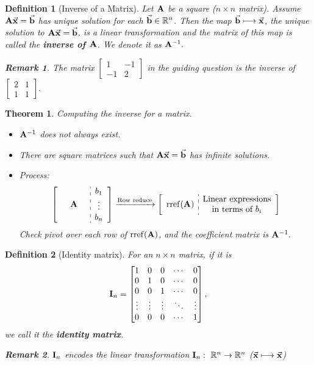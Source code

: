 \documentclass[12pt, a4paper]{article}
\newtheorem{thm}{Theorem}[subsection]
\newtheorem{df}{Definition}[subsection]
\newtheorem*{rmk}{\indent Remark}
\def\R{{\mathbb{R}}}
\def\rref{\mathrm{rref}}
\def\vecx{\va{x}}
\def\vecb{\va{b}}
\def\matrixA{\vb{A}}
\def\matrixI{\vb{I}}
\begin{document}
\begin{df}[Inverse of a Matrix]
	Let $\matrixA$ be a square ($n\times n$ matrix). Assume $\matrixA\vecx=\vecb$ has unique solution for each $\vecb\in\R^n$. Then the map $\vecb\longmapsto\vecx$, the unique solution to $\matrixA\vecx=\vecb$, is a linear transformation and the matrix of this map is called the \textbf{inverse of $\matrixA$}. We denote it as $\matrixA^{-1}.$
	\begin{rmk}
		The matrix $\begin{bmatrix}1&-1\\-1&2\end{bmatrix}$ in the guiding question is the inverse of $\begin{bmatrix}2&1\\1&1\end{bmatrix}.$	
	\end{rmk}
\end{df}
\begin{thm}
	Computing the inverse for a matrix.
	\begin{itemize}
		\item $\matrixA^{-1}$ does not always exist. 
		\item There are square matrices such that $\matrixA\vecx=\vecb$ has infinite solutions.
		\item Process:
		\[\left[\begin{array}{c:c}\quad\matrixA\quad &\begin{matrix}b_1\\\vdots\\b_n\end{matrix}\end{array}\right]\xrightarrow{\text{Row reduce}}\left[\begin{array}{c:c}\rref(\matrixA) &\begin{matrix}\text{Linear expressions}\\\text{in terms of }b_i\end{matrix}\end{array}\right]\]
		Check pivot over each row of $\rref(\matrixA)$, and the coefficient matrix is $\matrixA^{-1}.$
	\end{itemize}	
\end{thm}
\begin{df}[Identity matrix]
	For an $n\times n$ matrix, if it is \[\matrixI_n=\begin{bmatrix}1&0&0&\cdots&0\\0&1&0&\cdots&0\\0&0&1&\cdots&0\\\vdots&\vdots&\vdots&\ddots&\vdots\\0&0&0&\cdots&1\end{bmatrix},\] we call it the \textbf{identity matrix}. 
	\begin{rmk}
		$\matrixI_n$ encodes the linear transformation $\matrixI_n:\ \R^n\rightarrow\R^n$ ($\vecx\longmapsto\vecx$)
	\end{rmk}
\end{df}
\end{document}
